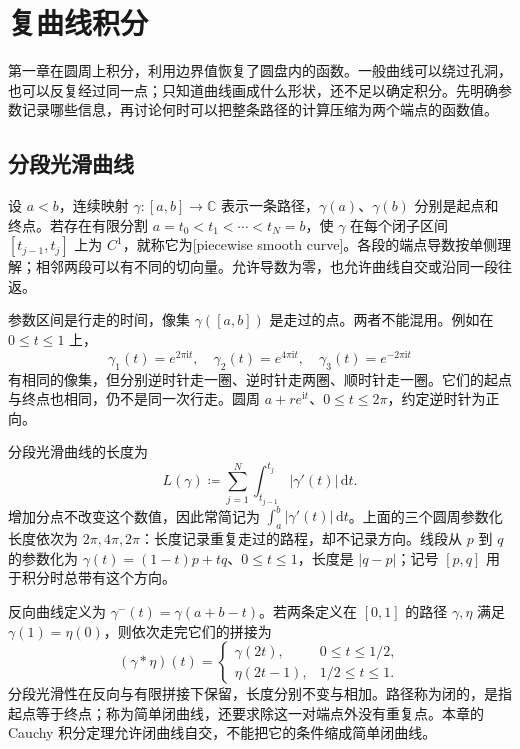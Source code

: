 \section{复曲线积分}
\label{b3:sec:0201}

第一章在圆周上积分，利用边界值恢复了圆盘内的函数。一般曲线可以绕过孔洞，也可以反复经过同一点；只知道曲线画成什么形状，还不足以确定积分。先明确参数记录哪些信息，再讨论何时可以把整条路径的计算压缩为两个端点的函数值。

\subsection{分段光滑曲线}
\label{b3:subsec:020101}

设 \(a<b\)，连续映射 \(\gamma:[a,b]\rightarrow\mathbb C\) 表示一条路径，\(\gamma(a)\)、\(\gamma(b)\) 分别是起点和终点。若存在有限分割
\(a=t_0<t_1<\cdots<t_N=b\)，使 \(\gamma\) 在每个闭子区间 \([t_{j-1},t_j]\) 上为 \(C^1\)，就称它为[piecewise smooth curve]。各段的端点导数按单侧理解；相邻两段可以有不同的切向量。允许导数为零，也允许曲线自交或沿同一段往返。

\ProseParagraphBreak

参数区间是行走的时间，像集 \(\gamma([a,b])\) 是走过的点。两者不能混用。例如在 \(0\le t\le1\) 上，
\[
 \gamma_1(t)=e^{2\pi\mathrm{i}t},
 \quad \gamma_2(t)=e^{4\pi\mathrm{i}t},
 \quad \gamma_3(t)=e^{-2\pi\mathrm{i}t}
\]
有相同的像集，但分别逆时针走一圈、逆时针走两圈、顺时针走一圈。它们的起点与终点也相同，仍不是同一次行走。圆周 \(a+re^{\mathrm{i}t}\)、\(0\le t\le2\pi\)，约定逆时针为正向。

\ProseParagraphBreak

分段光滑曲线的长度为
\[
 L(\gamma)\coloneqq\sum_{j=1}^N
 \int_{t_{j-1}}^{t_j}|\gamma'(t)|\,\mathrm{d}t.
\]
增加分点不改变这个数值，因此常简记为 \(\int_a^b|\gamma'(t)|\,\mathrm{d}t\)。上面的三个圆周参数化长度依次为 \(2\pi,4\pi,2\pi\)：长度记录重复走过的路程，却不记录方向。线段从 \(p\) 到 \(q\) 的参数化为 \(\gamma(t)=(1-t)p+tq\)、\(0\le t\le1\)，长度是 \(|q-p|\)；记号 \([p,q]\) 用于积分时总带有这个方向。

\ProseParagraphBreak

反向曲线定义为 \(\gamma^-(t)=\gamma(a+b-t)\)。若两条定义在 \([0,1]\) 的路径 \(\gamma,\eta\) 满足 \(\gamma(1)=\eta(0)\)，则依次走完它们的拼接为
\[
 (\gamma*\eta)(t)=
 \begin{cases}
 \gamma(2t),&0\le t\le1/2,\\
 \eta(2t-1),&1/2\le t\le1.
 \end{cases}
\]
分段光滑性在反向与有限拼接下保留，长度分别不变与相加。路径称为闭的，是指起点等于终点；称为简单闭曲线，还要求除这一对端点外没有重复点。本章的 Cauchy 积分定理允许闭曲线自交，不能把它的条件缩成简单闭曲线。

